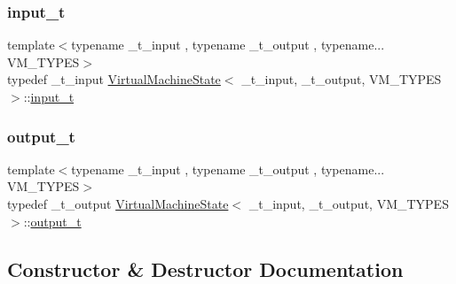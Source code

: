 \mbox{\label{class_virtual_machine_state_a04c5592dddd5b9ffdae5a509d73127dd}} 
\subsubsection{\texorpdfstring{input\+\_\+t}{input\_t}}
{\footnotesize\ttfamily template$<$typename \+\_\+t\+\_\+input , typename \+\_\+t\+\_\+output , typename... V\+M\+\_\+\+T\+Y\+P\+ES$>$ \\
typedef \+\_\+t\+\_\+input \hyperlink{class_virtual_machine_state}{Virtual\+Machine\+State}$<$ \+\_\+t\+\_\+input, \+\_\+t\+\_\+output, V\+M\+\_\+\+T\+Y\+P\+ES $>$\+::\hyperlink{class_virtual_machine_state_a04c5592dddd5b9ffdae5a509d73127dd}{input\+\_\+t}}

\mbox{\label{class_virtual_machine_state_a005a025f97d9505b00e7f9f0e99002bb}} 
\subsubsection{\texorpdfstring{output\+\_\+t}{output\_t}}
{\footnotesize\ttfamily template$<$typename \+\_\+t\+\_\+input , typename \+\_\+t\+\_\+output , typename... V\+M\+\_\+\+T\+Y\+P\+ES$>$ \\
typedef \+\_\+t\+\_\+output \hyperlink{class_virtual_machine_state}{Virtual\+Machine\+State}$<$ \+\_\+t\+\_\+input, \+\_\+t\+\_\+output, V\+M\+\_\+\+T\+Y\+P\+ES $>$\+::\hyperlink{class_virtual_machine_state_a005a025f97d9505b00e7f9f0e99002bb}{output\+\_\+t}}



\subsection{Constructor \& Destructor Documentation}
\mbox{\label{class_virtual_machine_state_a29c8e836431bb281d86215bf6f3e54d9}} 
